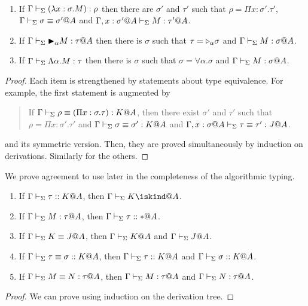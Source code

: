 \begin{lemma}[Inversion]\ 
	\begin{enumerate}
		\item If $\Gamma \vdash_\Sigma (\lambda x:\sigma.M) : \rho$ then there are $\sigma'$ and $\tau'$ such that
		      $\rho = \Pi x:\sigma'.\tau'$, $\Gamma \vdash_\Sigma \sigma \equiv \sigma'@A$ and $\Gamma ,x:\sigma'@A\vdash_\Sigma M:\tau'@A$.
		\item If $\G \V \TB_\alpha M : \tau@A$ then 
		      there is $\sigma$ such that $\tau = {\mathop{\triangleright}}_\alpha \sigma$ and $\G \V M : \sigma@A$.
		  \item If $\Gamma \vdash_\Sigma \Lambda\alpha.M : \tau$ then 
		  there is $\sigma$ such that $\sigma = \forall\alpha.\sigma$ and $\G \V M : \sigma@A$.%
	\end{enumerate}
\end{lemma}

\begin{proof}
  Each item is strengthened by statements about type equivalence.
  For example, the first statement is augmented by
  \begin{quotation}
    If $\Gamma \vdash_\Sigma \rho \equiv (\Pi x:\sigma.\tau) : K @A$, then there exist
    $\sigma'$ and $\tau'$ such that $\rho = \Pi x:\sigma'.\tau'$ and
    $\Gamma \vdash_\Sigma \sigma \equiv \sigma' : K @A$ and
    $\G, x:\sigma@A\V \tau \E \tau' : J @A$.
  \end{quotation}
  and its symmetric version.  Then, they are proved simultaneously by induction on derivations.
  Similarly for the others.
\end{proof}

We prove agreement to use later in the completeness of the algorithmic typing.

\begin{lemma}[Agreement]
    \label{lemma:Agreement}
	\begin{enumerate}
		\item If \(\Gamma\vdash_\Sigma \tau::K@A\), then \(\G\V K\iskind@A \).
		\item If \(\G\V M:\tau@A\), then \(\Gamma\vdash_\Sigma \tau::*@A\).
		\item If \(\Gamma\vdash_\Sigma K\equiv J@A\), then \(\Gamma\vdash_\Sigma K @A\) and \(\Gamma\vdash_\Sigma J @A\).
		\item If \(\Gamma\vdash_\Sigma \tau\equiv \sigma :: K@A\), then \(\Gamma\vdash_\Sigma \tau::K@A\) and \(\Gamma\vdash_\Sigma \sigma::K@A\).
		\item If \(\G\V M\E N : \tau@A\), then \(\G\V M:\tau@A\) and \(\G\V N:\tau@A\).
	\end{enumerate}
\end{lemma}
\begin{proof}
	We can prove using induction on the derivation tree.
\end{proof}

